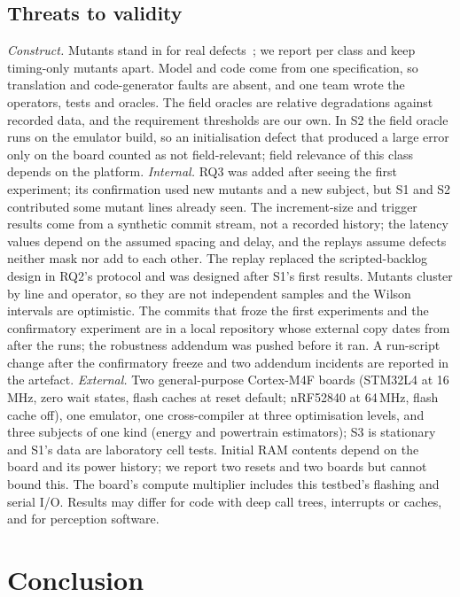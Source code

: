 \documentclass[conference]{IEEEtran}
\begin{document}
\subsection{Threats to validity}\label{sec:threats}
\emph{Construct.} Mutants stand in for real defects~\cite{just2014}; we report per class and keep timing-only
mutants apart. Model and code come from one specification, so translation and code-generator faults are
absent, and one team wrote the operators, tests and oracles. The field oracles are relative degradations against recorded data, and the requirement thresholds
are our own. In S2 the field oracle runs on the emulator build, so an initialisation defect that produced a
large error only on the board counted as not field-relevant; field relevance of this class depends on the
platform.
\emph{Internal.} RQ3 was added after seeing the first experiment; its confirmation used new mutants and a new
subject, but S1 and S2 contributed some mutant lines already seen. The
increment-size and trigger results come from a synthetic commit stream, not a recorded history; the latency values depend on
the assumed spacing and delay, and the replays assume defects neither mask nor add to each other. The replay replaced the
scripted-backlog design in RQ2's protocol and was designed after S1's first results. Mutants cluster by line
and operator, so they are not independent samples and the Wilson intervals are optimistic. The commits that froze the
first experiments and the confirmatory experiment are in a local repository whose external copy dates from
after the runs; the robustness addendum was pushed before it ran. A run-script change after the confirmatory
freeze and two addendum incidents are reported in the artefact.
\emph{External.} Two general-purpose Cortex-M4F boards (STM32L4 at 16\,MHz, zero wait states, flash caches
at reset default; nRF52840 at 64\,MHz, flash cache off), one
emulator, one cross-compiler at three optimisation levels, and three subjects of one
kind (energy and powertrain estimators); S3 is stationary and S1's data are laboratory cell tests. Initial RAM contents depend on the board and its power history; we
report two resets and two boards but cannot bound this. The board's compute multiplier includes this
testbed's flashing and serial I/O. Results may differ for code with deep call trees, interrupts or
caches, and for perception software.

\section{Conclusion}
\end{document}
